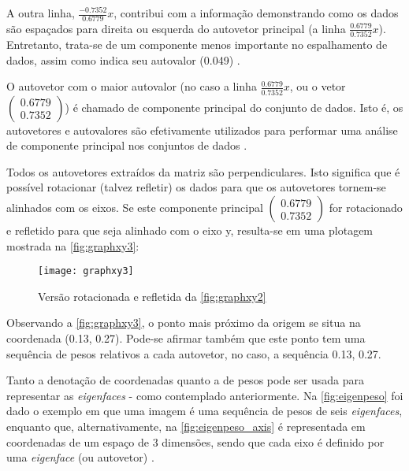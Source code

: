 A outra linha, $\frac{-0.7352}{0.6779}$$x$, contribui com a informação demonstrando como os dados são espaçados para direita ou esquerda do autovetor principal (a linha $\frac{0.6779}{0.7352}$$x$). Entretanto, trata-se de um componente menos importante no espalhamento de dados, assim como indica seu autovalor (0.049) \cite{drmathew_java_programming}.

O autovetor com o maior autovalor (no caso a linha $\frac{0.6779}{0.7352}$$x$, ou o vetor $\begin{pmatrix} 0.6779 \\ 0.7352 \end{pmatrix}$) é chamado de componente principal do conjunto de dados. Isto é, os autovetores e autovalores são efetivamente utilizados para performar uma análise de componente principal nos conjuntos de dados \cite{drmathew_java_programming}.

Todos os autovetores extraídos da matriz são perpendiculares. Isto significa que é possível rotacionar (talvez refletir) os dados para que os autovetores tornem-se alinhados com os eixos. Se este componente principal $\begin{pmatrix} 0.6779 \\ 0.7352 \end{pmatrix}$ for rotacionado e refletido para que seja alinhado com o eixo y, resulta-se em uma plotagem mostrada na \autoref{fig:graphxy3}:

\begin{figure}[h]
	\centering
	\texttt{[image: graphxy3]}
	\caption{Versão rotacionada e refletida da \autoref{fig:graphxy2}}
	\label{fig:graphxy3}
\end{figure}

Observando a \autoref{fig:graphxy3}, o ponto mais próximo da origem se situa na coordenada (0.13, 0.27). Pode-se afirmar também que este ponto tem uma sequência de pesos relativos a cada autovetor, no caso, a sequência {0.13, 0.27}.

Tanto a denotação de coordenadas quanto a de pesos pode ser usada para representar as \textit{eigenfaces} - como contemplado anteriormente. Na \autoref{fig:eigenpeso} foi dado o exemplo em que uma imagem é uma sequência de pesos de seis \textit{eigenfaces}, enquanto que, alternativamente, na  \autoref{fig:eigenpeso_axis} é representada em coordenadas de um espaço de 3 dimensões, sendo que cada eixo é definido por uma \textit{eigenface} (ou autovetor) \cite{drmathew_java_programming}.



